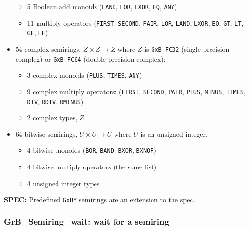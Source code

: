 \documentclass[12pt]{article}
\begin{document}
\begin{itemize}
    \vspace{-0.05in}
    \begin{itemize}
    \item 5 Boolean add monoids
    (\verb'LAND', \verb'LOR', \verb'LXOR', \verb'EQ', \verb'ANY')
    \item 11 multiply operators
    (\verb'FIRST', \verb'SECOND', \verb'PAIR', \verb'LOR', \verb'LAND', \verb'LXOR',
    \verb'EQ', \verb'GT', \verb'LT', \verb'GE', \verb'LE')
    \end{itemize}

\item 54 complex semirings, $Z \times Z \rightarrow Z$ where $Z$ is
    \verb'GxB_FC32' (single precision complex) or
    \verb'GxB_FC64' (double precision complex):

    \vspace{-0.05in}
    \begin{itemize}
    \item 3 complex monoids (\verb'PLUS', \verb'TIMES', \verb'ANY')
    \item 9 complex multiply operators:
        (\verb'FIRST', \verb'SECOND', \verb'PAIR', \verb'PLUS', \verb'MINUS',
            \verb'TIMES', \verb'DIV', \verb'RDIV', \verb'RMINUS')
    \item 2 complex types, $Z$
    \end{itemize}

\item 64 bitwise semirings, $U \times U \rightarrow U$ where $U$ is
    an unsigned integer.

    \vspace{-0.05in}
    \begin{itemize}
    \item 4 bitwise monoids (\verb'BOR', \verb'BAND', \verb'BXOR', \verb'BXNOR')
    \item 4 bitwise multiply operators (the same list)
    \item 4 unsigned integer types
    \end{itemize}

\end{itemize}

\begin{spec}
{\bf SPEC:} Predefined \verb'GxB*' semirings are an extension to the spec.
\end{spec}

\subsubsection{{\sf GrB\_Semiring\_wait:} wait for a semiring}
\end{document}
